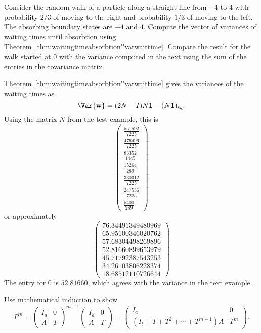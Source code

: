 \documentclass[12pt]{article}
\begin{document}
\begin{exercise}
  Consider the random walk of a particle along a straight line from $-4$ to
  $4$ with probability $2/3$ of moving to the right and probability
  $1/3$ of moving to the left.  The absorbing boundary states are $-4$
  and $4$. Compute the vector of variances of waiting times until
  absorbtion using
  Theorem~\ref{thm:waitingtimeabsorbtion''varwaittime}.  Compare the
  result for the walk started at $0$ with the variance computed in the
  text using the sum of the entries in the covariance matrix.
\end{exercise}
\begin{solution}
  Theorem~\ref{thm:waitingtimeabsorbtion''varwaittime} gives the
  variances of the waiting times as
  \[
     \Var{\mathbf{w}} = (2N - I)N\mathbf{1} -
     (N\mathbf{1})_{\text{sq}}.
   \]
   Using the matrix $N$ from the test example, this is
   \[\begin{pmatrix}\frac{551592}{7225}\\
\frac{476496}{7225}\\
\frac{83352}{1445}\\
\frac{15264}{289}\\
\frac{330312}{7225}\\
\frac{247536}{7225}\\
\frac{5400}{289}\end{pmatrix}\] or approximately
\[\begin{pmatrix}76.34491349480969\\
65.95100346020762\\
57.68304498269896\\
52.81660899653979\\
45.71792387543253\\
34.26103806228374\\
18.68512110726644\end{pmatrix}\]
The entry for $0$ is $52.81660$, which agrees with the variance in the
text example.
\end{solution}

\begin{exercise}
  Use mathematical induction to show
\[
    P^{m} =
    \begin{pmatrix}
        I_a & 0 \\
        A & T
    \end{pmatrix}
    ^{m-1}
    \begin{pmatrix}
        I_a & 0 \\
        A & T
    \end{pmatrix}
    =
    \begin{pmatrix}
        I_a & 0 \\
        (I_t + T + T^2 + \cdots + T^{m-1})A & T^m
    \end{pmatrix}.
\]
\end{exercise}
\end{document}
